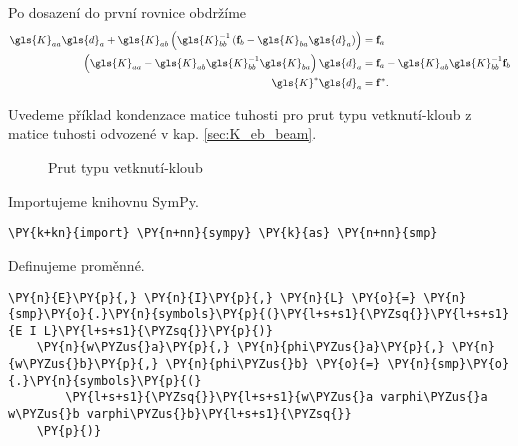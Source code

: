 Po dosazení do první rovnice obdržíme
\begin{equation} \label{eq:condensation}
    \begin{aligned}
        \gls{K}_{aa} \gls{d}_a + \gls{K}_{ab} \left(\gls{K}_{bb}^{-1} \left( \matr{f}_{b} - \gls{K}_{ba} \gls{d}_a \right)\right) &= \matr{f}_a \\
        \left(\gls{K}_{aa} - \gls{K}_{ab} \gls{K}_{bb}^{-1} \gls{K}_{ba}\right) \gls{d}_a &= \matr{f}_a - \gls{K}_{ab} \gls{K}_{bb}^{-1} \matr{f}_{b}\\
        \gls{K}^* \gls{d}_{a} &= \matr{f}^*.
    \end{aligned}
\end{equation}
 
Uvedeme příklad kondenzace matice tuhosti pro prut typu vetknutí-kloub z matice tuhosti odvozené v kap. \ref{sec:K_eb_beam}.

\begin{figure}[H]
    
    \caption{Prut typu vetknutí-kloub}
    \label{fig:beam_clamped}
\end{figure}


Importujeme knihovnu SymPy.
\begin{tcolorbox}[breakable, size=fbox, boxrule=1pt, pad at break*=1mm,colback=cellbackground, colframe=cellborder]
    \begin{Verbatim}[commandchars=\\\{\}]
    \PY{k+kn}{import} \PY{n+nn}{sympy} \PY{k}{as} \PY{n+nn}{smp}
    \end{Verbatim}
\end{tcolorbox}
    
Definujeme proměnné.
\begin{tcolorbox}[breakable, size=fbox, boxrule=1pt, pad at break*=1mm,colback=cellbackground, colframe=cellborder]
    \begin{Verbatim}[commandchars=\\\{\}]
    \PY{n}{E}\PY{p}{,} \PY{n}{I}\PY{p}{,} \PY{n}{L} \PY{o}{=} \PY{n}{smp}\PY{o}{.}\PY{n}{symbols}\PY{p}{(}\PY{l+s+s1}{\PYZsq{}}\PY{l+s+s1}{E I L}\PY{l+s+s1}{\PYZsq{}}\PY{p}{)}
    \PY{n}{w\PYZus{}a}\PY{p}{,} \PY{n}{phi\PYZus{}a}\PY{p}{,} \PY{n}{w\PYZus{}b}\PY{p}{,} \PY{n}{phi\PYZus{}b} \PY{o}{=} \PY{n}{smp}\PY{o}{.}\PY{n}{symbols}\PY{p}{(}
        \PY{l+s+s1}{\PYZsq{}}\PY{l+s+s1}{w\PYZus{}a varphi\PYZus{}a w\PYZus{}b varphi\PYZus{}b}\PY{l+s+s1}{\PYZsq{}}
    \PY{p}{)}
    \end{Verbatim}
\end{tcolorbox}

